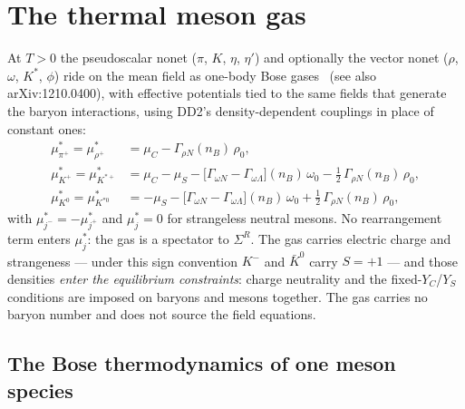 \documentclass[aps,prc,onecolumn,superscriptaddress,nofootinbib,10pt]{revtex4-2}
\newcommand{\nB}{n_B}
\newcommand{\muC}{\mu_C}
\newcommand{\muS}{\mu_S}
\newcommand{\SigR}{\Sigma^{R}}
\begin{document}
\section{The thermal meson gas}
\label{sec:gas}

At $T>0$ the pseudoscalar nonet ($\pi$, $K$, $\eta$, $\eta'$) and optionally
the vector nonet ($\rho$, $\omega$, $K^*$, $\phi$) ride on the mean field as
one-body Bose gases~\cite{Lavagno2010} (see also arXiv:1210.0400), with
effective potentials tied to the same fields that generate the baryon
interactions, using DD2's density-dependent couplings in place of constant
ones:
%
\begin{align}
\mu^{*}_{\pi^+} = \mu^{*}_{\rho^+} &= \muC - \Gamma_{\rho N}(\nB)\, \rho_0 ,
\nonumber\\
\mu^{*}_{K^+} = \mu^{*}_{K^{*+}} &= \muC - \muS
   - \big[ \Gamma_{\omega N} - \Gamma_{\omega \Lambda} \big](\nB)\, \omega_0
   - \tfrac12\, \Gamma_{\rho N}(\nB)\, \rho_0 ,
\label{eq:mesonshifts}\\
\mu^{*}_{K^0} = \mu^{*}_{K^{*0}} &= - \muS
   - \big[ \Gamma_{\omega N} - \Gamma_{\omega \Lambda} \big](\nB)\, \omega_0
   + \tfrac12\, \Gamma_{\rho N}(\nB)\, \rho_0 ,
\nonumber
\end{align}
%
with $\mu^{*}_{j^-} = -\mu^{*}_{j^+}$ and $\mu^{*}_j = 0$ for strangeless
neutral mesons. No rearrangement term enters $\mu^{*}_j$: the gas is a
spectator to $\SigR$. The gas carries electric charge and strangeness ---
under this sign convention $K^-$ and $\bar K^0$ carry $S=+1$ --- and those
densities \emph{enter the equilibrium constraints}: charge neutrality and the
fixed-$Y_C$/$Y_S$ conditions are imposed on baryons and mesons together. The
gas carries no baryon number and does not source the field equations.

\subsection{The Bose thermodynamics of one meson species}
\end{document}
